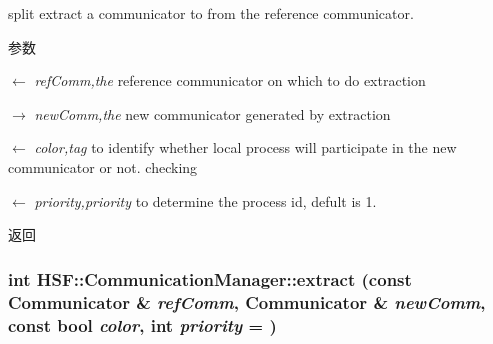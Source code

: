 split extract a communicator to from the reference communicator. 
\begin{DoxyParams}{参数}
\item[\mbox{$\leftarrow$} {\em refComm,the}]reference communicator on which to do extraction \item[\mbox{$\rightarrow$} {\em newComm,the}]new communicator generated by extraction \item[\mbox{$\leftarrow$} {\em color,tag}]to identify whether local process will participate in the new communicator or not. checking \item[\mbox{$\leftarrow$} {\em priority,priority}]to determine the process id, defult is 1. \end{DoxyParams}
\begin{DoxyReturn}{返回}

\end{DoxyReturn}
\hypertarget{classHSF_1_1CommunicationManager_ac9867c3a68d13f2f9cfd54393d8c06ad}{
\subsubsection[{extract}]{\setlength{\rightskip}{0pt plus 5cm}int HSF::CommunicationManager::extract (const {\bf Communicator} \& {\em refComm}, \/  {\bf Communicator} \& {\em newComm}, \/  const bool {\em color}, \/  int {\em priority} = {})}}
\label{classHSF_1_1CommunicationManager_ac9867c3a68d13f2f9cfd54393d8c06ad}


